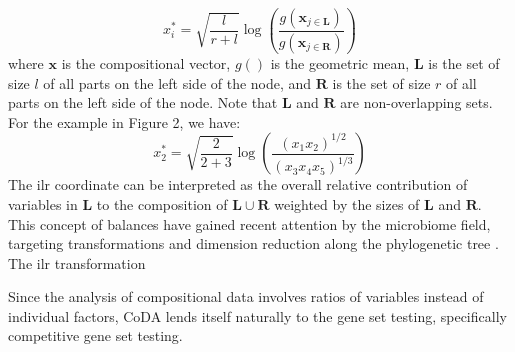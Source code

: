 \documentclass{article}
\begin{document}
$$x_i^* = \sqrt{\frac{l}{r + l}} \log \left(\frac{g(\bm{x}_{j \in \bm{L}})}{g(\bm{x}_{j \in \bm{R}})}\right)$$
where $\bm{x}$ is the compositional vector, $g()$ is the geometric mean, $\bm{L}$ is the set of size $l$ of all parts on the left side of the node, and $\bm R$ is the set of size $r$ of all parts on the left side of the node. Note that $\bm L$ and $\bm R$ are non-overlapping sets. For the example in Figure 2, we have: 
$$x_2^* = \sqrt{\frac{2}{2 + 3}} \log \left( \frac{(x_1x_2)^{1/2}}{(x_3x_4x_5)^{1/3}}\right)$$
The ilr coordinate can be interpreted as the overall relative contribution of variables in $\bm L$ to the composition of $\bm L \cup \bm R$ weighted by the sizes of $\bm L$ and $\bm R$. This concept of balances have gained recent attention by the microbiome field, targeting transformations and dimension reduction along the phylogenetic tree \cite{washburne2017a, silverman2017a}. The ilr transformation 

\noindent Since the analysis of compositional data involves ratios of variables instead of individual factors, CoDA lends itself naturally to the gene set testing, specifically competitive gene set testing. 

\newpage
{}

\end{document}
